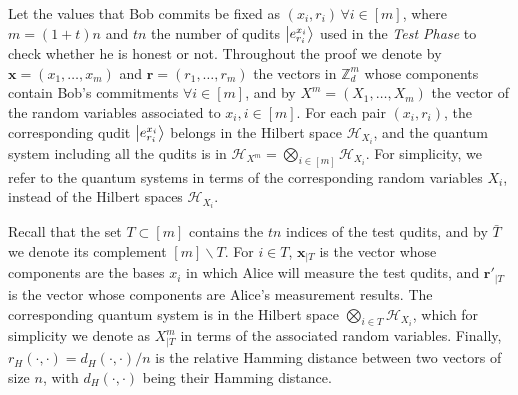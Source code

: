 Let the values that Bob commits be fixed as  $(x_i, r_i)\, \forall i\in[m]$, where $m = (1+t)n$ and $t n$  the number of qudits $\ket{e^{x_i}_{r_i}}$ used in the \textit{Test Phase} to check whether he is honest or not. Throughout the proof we denote by $\boldsymbol{x} = (x_1, \ldots, x_m)$ and $\boldsymbol{r} = (r_1, \ldots, r_m)$ the vectors in $\mathbb{Z}_d^m$ whose components contain Bob's commitments $\forall i\in [m]$, and by $X^m=(X_1,\ldots,X_m)$ the vector of the  random variables associated to  $x_i, i\in [m]$. For each  pair $(x_i, r_i)$, the corresponding qudit $\ket{e^{x_i}_{r_i}}$ belongs in the Hilbert space $\mathcal{H}_{X_i}$, and the quantum system including all the qudits is in $\mathcal{H}_{X^m}=\bigotimes_{i\in [m]}\mathcal{H}_{X_i}$. For simplicity, we refer to the quantum systems in terms of the corresponding  random variables  $X_i$, instead of the Hilbert spaces $\mathcal{H}_{X_i}$.


Recall that the set $T\subset[m]$ contains the $tn$ indices of the test qudits, and by $\bar{T}$ we denote its complement $[m]\backslash T$.  For  $i\in T$, $\boldsymbol{x}_{|T}$ is the vector whose components are the  bases $x_i$  in which Alice will measure the test qudits, and $ \boldsymbol{r'}_{|T}$ is the vector whose components are Alice's measurement results. The corresponding quantum system is in the Hilbert space $\bigotimes_{i\in T}\mathcal{H}_{X_i}$, which for simplicity we denote as $X^m_{|T}$ in terms of the associated random variables.   
Finally, $r_H(\cdot, \cdot)=d_H(\cdot, \cdot)/n$ is the relative Hamming distance between two  vectors of size $n$, with $d_H(\cdot, \cdot)$ being their Hamming distance.


